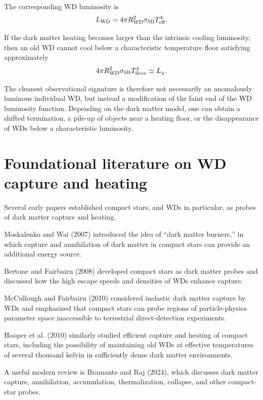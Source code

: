 \documentclass[11pt,a4paper]{article}
\begin{document}
The corresponding WD luminosity is
\begin{equation}
L_{\rm WD} =
4\pi R_{\rm WD}^2
\sigma_{\rm SB}
T_{\rm eff}^4.
\end{equation}

If the dark matter heating becomes larger than the intrinsic cooling luminosity, then an old WD cannot cool below a characteristic temperature floor satisfying approximately
\begin{equation}
4\pi R_{\rm WD}^2
\sigma_{\rm SB}
T_{\rm floor}^4
\simeq
L_\chi.
\end{equation}

The cleanest observational signature is therefore not necessarily an anomalously luminous individual WD, but instead a modification of the faint end of the WD luminosity function. Depending on the dark matter model, one can obtain a shifted termination, a pile-up of objects near a heating floor, or the disappearance of WDs below a characteristic luminosity.


\section{Foundational literature on WD capture and heating}

Several early papers established compact stars, and WDs in particular, as probes of dark matter capture and heating.

Moskalenko and Wai (2007) introduced the idea of ``dark matter burners,'' in which capture and annihilation of dark matter in compact stars can provide an additional energy source.

Bertone and Fairbairn (2008) developed compact stars as dark matter probes and discussed how the high escape speeds and densities of WDs enhance capture.

McCullough and Fairbairn (2010) considered inelastic dark matter capture by WDs and emphasized that compact stars can probe regions of particle-physics parameter space inaccessible to terrestrial direct-detection experiments.

Hooper et al. (2010) similarly studied efficient capture and heating of compact stars, including the possibility of maintaining old WDs at effective temperatures of several thousand kelvin in sufficiently dense dark matter environments.

A useful modern review is Bramante and Raj (2024), which discusses dark matter capture, annihilation, accumulation, thermalization, collapse, and other compact-star probes.
\end{document}
